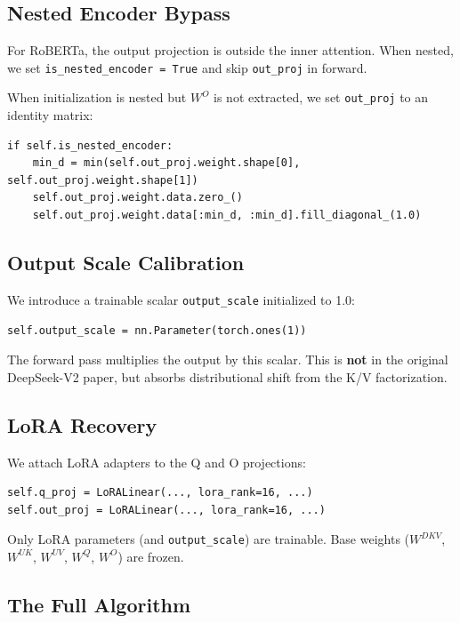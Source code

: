 \subsection{Nested Encoder Bypass}

For RoBERTa, the output projection is outside the inner attention. When 
nested, we set \texttt{is\_nested\_encoder = True} and skip \texttt{out\_proj} in forward.

When initialization is nested but $W^O$ is not extracted, we set 
\texttt{out\_proj} to an identity matrix:

\begin{lstlisting}
if self.is_nested_encoder:
    min_d = min(self.out_proj.weight.shape[0], self.out_proj.weight.shape[1])
    self.out_proj.weight.data.zero_()
    self.out_proj.weight.data[:min_d, :min_d].fill_diagonal_(1.0)
\end{lstlisting}

\subsection{Output Scale Calibration}

We introduce a trainable scalar \texttt{output\_scale} initialized to 1.0:

\begin{lstlisting}
self.output_scale = nn.Parameter(torch.ones(1))
\end{lstlisting}

The forward pass multiplies the output by this scalar. This is \textbf{not} in 
the original DeepSeek-V2 paper, but absorbs distributional shift from the 
K/V factorization.

\subsection{LoRA Recovery}

We attach LoRA adapters to the Q and O projections:

\begin{lstlisting}
self.q_proj = LoRALinear(..., lora_rank=16, ...)
self.out_proj = LoRALinear(..., lora_rank=16, ...)
\end{lstlisting}

Only LoRA parameters (and \texttt{output\_scale}) are trainable. Base weights 
($W^{DKV}$, $W^{UK}$, $W^{UV}$, $W^Q$, $W^O$) are frozen.

\subsection{The Full Algorithm}

